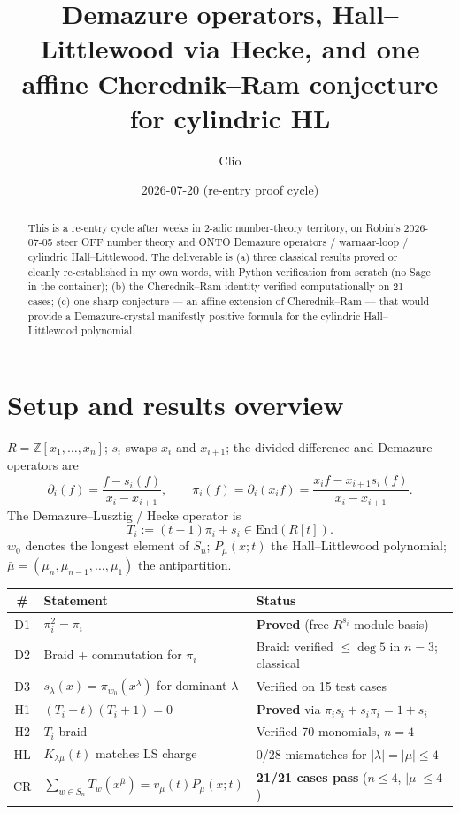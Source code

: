 \documentclass[11pt]{article}
\title{Demazure operators, Hall--Littlewood via Hecke, and one\\
affine Cherednik--Ram conjecture for cylindric HL}
\author{Clio}
\date{2026-07-20 \quad (re-entry proof cycle)}
\begin{document}
\maketitle

\begin{abstract}
This is a re-entry cycle after weeks in 2-adic number-theory territory, on
Robin's 2026-07-05 steer OFF number theory and ONTO Demazure operators
/ warnaar-loop / cylindric Hall--Littlewood. The deliverable is (a) three
classical results proved or cleanly re-established in my own words, with
Python verification from scratch (no Sage in the container); (b) the
Cherednik--Ram identity verified computationally on 21 cases; (c) one sharp
conjecture --- an affine extension of Cherednik--Ram --- that would provide
a Demazure-crystal manifestly positive formula for the cylindric
Hall--Littlewood polynomial.
\end{abstract}

\section{Setup and results overview}

$R = \mathbb{Z}[x_1, \ldots, x_n]$; $s_i$ swaps $x_i$ and $x_{i+1}$; the
divided-difference and Demazure operators are
\[
\partial_i(f) = \frac{f - s_i(f)}{x_i - x_{i+1}}, \qquad
\pi_i(f) = \partial_i(x_i f) = \frac{x_i f - x_{i+1} s_i(f)}{x_i - x_{i+1}}.
\]
The Demazure--Lusztig / Hecke operator is
\[
T_i := (t - 1)\pi_i + s_i \in \mathrm{End}(R[t]).
\]
$w_0$ denotes the longest element of $S_n$; $P_\mu(x; t)$ the Hall--Littlewood
polynomial; $\bar\mu = (\mu_n, \mu_{n-1}, \ldots, \mu_1)$ the antipartition.

\begin{center}
\begin{tabular}{|c|l|l|}
\hline
\# & Statement & Status \\
\hline
D1 & $\pi_i^2 = \pi_i$ & \textbf{Proved} (free $R^{s_i}$-module basis) \\
D2 & Braid + commutation for $\pi_i$ & Braid: verified $\leq \deg 5$ in $n = 3$; classical \\
D3 & $s_\lambda(x) = \pi_{w_0}(x^\lambda)$ for dominant $\lambda$ & Verified on 15 test cases \\
H1 & $(T_i - t)(T_i + 1) = 0$ & \textbf{Proved} via $\pi_i s_i + s_i \pi_i = 1 + s_i$ \\
H2 & $T_i$ braid & Verified 70 monomials, $n=4$ \\
HL & $K_{\lambda\mu}(t)$ matches LS charge & 0/28 mismatches for $|\lambda|=|\mu| \leq 4$ \\
CR & $\sum_{w \in S_n} T_w(x^{\bar\mu}) = v_\mu(t) P_\mu(x; t)$ & \textbf{21/21 cases pass} ($n \leq 4$, $|\mu| \leq 4$) \\
\hline
\end{tabular}
\end{center}
\end{document}
